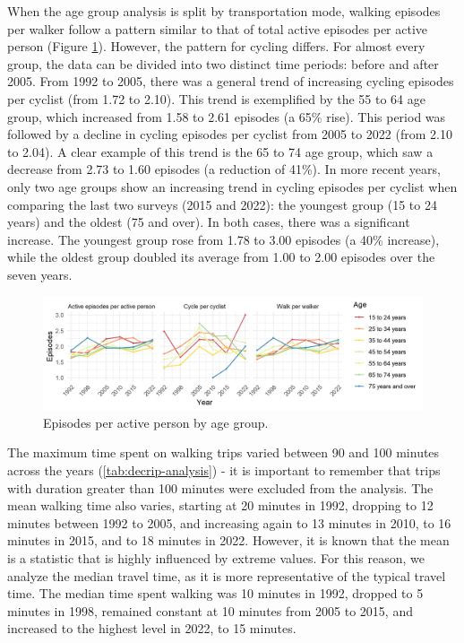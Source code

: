 \documentclass[preprint, 3p,
authoryear]{elsarticle} %
\begin{document}
When the age group analysis is split by transportation mode, walking
episodes per walker follow a pattern similar to that of total active
episodes per active person (Figure \ref{fig:age-eps-figure}). However,
the pattern for cycling differs. For almost every group, the data can be
divided into two distinct time periods: before and after 2005. From 1992
to 2005, there was a general trend of increasing cycling episodes per
cyclist (from 1.72 to 2.10). This trend is exemplified by the 55 to 64
age group, which increased from 1.58 to 2.61 episodes (a 65\% rise).
This period was followed by a decline in cycling episodes per cyclist
from 2005 to 2022 (from 2.10 to 2.04). A clear example of this trend is
the 65 to 74 age group, which saw a decrease from 2.73 to 1.60 episodes
(a reduction of 41\%). In more recent years, only two age groups show an
increasing trend in cycling episodes per cyclist when comparing the last
two surveys (2015 and 2022): the youngest group (15 to 24 years) and the
oldest (75 and over). In both cases, there was a significant increase.
The youngest group rose from 1.78 to 3.00 episodes (a 40\% increase),
while the oldest group doubled its average from 1.00 to 2.00 episodes
over the seven years.

\begin{figure}
\includegraphics[width=1\linewidth]{figures/eps_age_graph} \caption{Episodes per active person by age group.}\label{fig:age-eps-figure}
\end{figure}

The maximum time spent on walking trips varied between 90 and 100
minutes across the years (\ref{tab:decrip-analysis}) - it is important
to remember that trips with duration greater than 100 minutes were
excluded from the analysis. The mean walking time also varies, starting
at 20 minutes in 1992, dropping to 12 minutes between 1992 to 2005, and
increasing again to 13 minutes in 2010, to 16 minutes in 2015, and to 18
minutes in 2022. However, it is known that the mean is a statistic that
is highly influenced by extreme values. For this reason, we analyze the
median travel time, as it is more representative of the typical travel
time. The median time spent walking was 10 minutes in 1992, dropped to 5
minutes in 1998, remained constant at 10 minutes from 2005 to 2015, and
increased to the highest level in 2022, to 15 minutes.
\end{document}
